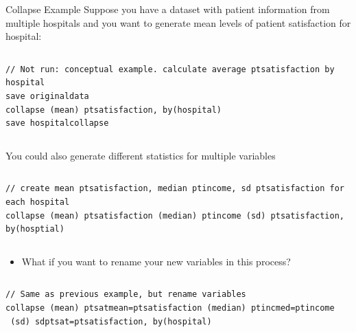 \documentclass[table,smaller]{beamer}
\begin{document}
\begin{frame}[fragile,label=sec-7-2]{Collapse Example}
 Suppose you have a dataset with patient  information from multiple hospitals and you want to generate mean levels of patient satisfaction for hospital: 

\vspace{-.5em} \begin{columns}  \begin{block}{}
\begin{verbatim}
// Not run: conceptual example. calculate average ptsatisfaction by hospital
save originaldata
collapse (mean) ptsatisfaction, by(hospital)
save hospitalcollapse
\end{verbatim}
\end{block} \end{columns}

You could also generate different statistics for multiple variables

\vspace{-.5em} \begin{columns}  \begin{block}{}
\begin{verbatim}
// create mean ptsatisfaction, median ptincome, sd ptsatisfaction for each hospital
collapse (mean) ptsatisfaction (median) ptincome (sd) ptsatisfaction, by(hosptial)
\end{verbatim}
\end{block} \end{columns}
\begin{itemize}
\item What if you want to rename your new variables in
this process?
\end{itemize}

\vspace{-.5em} \begin{columns}  \begin{block}{}
\begin{verbatim}
// Same as previous example, but rename variables
collapse (mean) ptsatmean=ptsatisfaction (median) ptincmed=ptincome
 (sd) sdptsat=ptsatisfaction, by(hospital)
\end{verbatim}
\end{block} \end{columns}
\end{frame}
\end{document}
